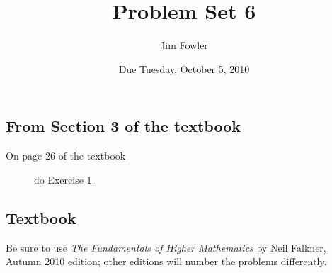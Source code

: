 \documentclass[12pt]{handout}
\author{Jim Fowler}
\title{Problem Set 6}
\date{Due Tuesday, October  5, 2010}
\begin{document}
\maketitle










\subsection*{From Section 3 of the textbook}



\begin{description}

\item[On page 26 of the textbook] do Exercise 1.

\end{description}











\subsection*{Textbook}
Be sure to use \textit{The Fundamentals of Higher Mathematics} by Neil Falkner, Autumn 2010 edition; other editions will number the problems differently.
\end{document}

